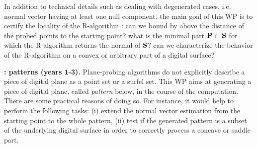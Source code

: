 In addition to technical details such as dealing with degenerated cases, 
i.e. normal vector having at least one null component, the main goal of this WP is to 
certify the locality of the R-algorithm \cite{LPRJMIV2017}: 
can we bound by above the distance of the probed points to the starting point? 
what is the minimal part $\mathbf{P} \subset \mathbf{S}$ for which the R-algorithm returns the normal of $\mathbf{S}$?
can we characterize the behavior of the R-algorithm on a convex or arbitrary part of a digital surface?


\noindent\textbf{\wpPattern: patterns (years 1-3).}
Plane-probing algorithms 
do not explicitly describe a piece of digital plane as a point set or a surfel set.  
This WP aims at generating a piece of digital plane, called \emph{pattern} below, in the course of the computation.%
There are some practical reasons of doing so. For instance, it would help to perform the following tasks: 
(i) extend the normal vector estimation from the starting point to the whole pattern, 
(ii) test if the generated pattern is a subset of the underlying digital surface 
in order to correctly process a concave or saddle part.

